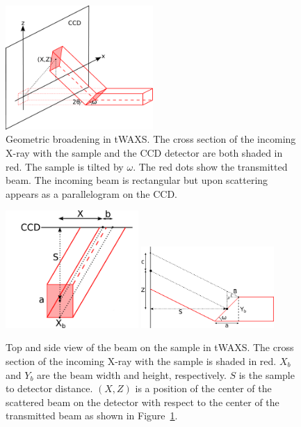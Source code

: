 \begin{figure}[htbp]
  \centering
  \includegraphics[width=0.5\textwidth]{figures/ripple/MMs/transmission/geometric_broadening1}
  \caption[Geometric broadening in tWAXS]{Geometric broadening in tWAXS. 
  The cross section of the incoming X-ray with the sample and the CCD 
  detector are both shaded in red. The sample is tilted by $\omega$.
  The red dots show the transmitted beam. The incoming beam is rectangular
  but upon scattering appears as a parallelogram on the CCD.}
  \label{fig:gb_trans1}
\end{figure}

\begin{figure}[htbp]
  \centering
  \includegraphics[width=0.45\textwidth]{figures/ripple/MMs/transmission/geometric_broadening2}
  \includegraphics[width=0.45\textwidth]{figures/ripple/MMs/transmission/geometric_broadening3}
  \caption[Top and side view of the beam on the sample in tWAXS]{Top and side 
  view of the beam on the sample in tWAXS. The cross section of the incoming X-ray 
  with the sample is shaded in red. 
  $X_b$ and $Y_b$ are the beam width and height, respectively. 
  $S$ is the sample to detector distance. 
  $(X,Z)$ is a  
	position of the center of the scattered beam on the detector with respect 
	to the center of the transmitted beam as shown in 
	Figure~\ref{fig:gb_trans1}.}
  \label{fig:gb_trans2}
\end{figure}

